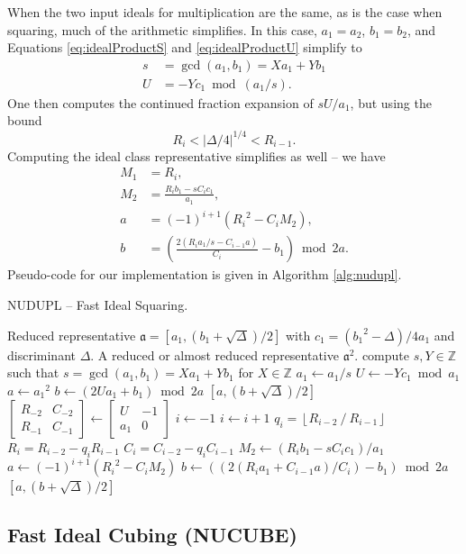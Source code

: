 \documentclass{ucalgthes1}
\theoremstyle{definition}
\newcommand{\ZZ}{\mathbb{Z}}
\newcommand{\matrixtt}[4]{\left[ \begin{array}{rr} #1 & #2 \\ #3 & #4 \end{array} \right]}
\newcommand{\floor}[1]{\left\lfloor #1 \right\rfloor}
\begin{document}
When the two input ideals for multiplication are the same, as is the case when squaring, much of the arithmetic simplifies.  In this case, $a_1 = a_2$, $b_1 = b_2$, and Equations \eqref{eq:idealProductS} and \eqref{eq:idealProductU} simplify to
\begin{align*}
	s &= \gcd(a_1, b_1) = Xa_1 + Yb_1 \\
	U &= -Yc_1 \bmod (a_1/s).
\end{align*}
One then computes the continued fraction expansion of $sU/a_1$, but using the bound
\[
	R_i < |\Delta/4|^{1/4} < R_{i-1}.
\]
Computing the ideal class representative simplifies as well -- we have
\begin{align*}
	M_1 &= R_i, \\
	M_2 &= \frac{R_i b_1 - sC_i c_1}{a_1}, \\
	a &= (-1)^{i+1}({R_i}^2 - C_i M_2), \\
	b &= \left(\frac{2(R_i a_1/s  - C_{i-1} a)}{C_i} - b_1 \right) \bmod{2a}.
\end{align*}
Pseudo-code for our implementation is given in Algorithm \ref{alg:nudupl}.

\begin{algorithm}[htb]
\caption{NUDUPL -- Fast Ideal Squaring.}
\label{alg:nudupl}
\begin{algorithmic}[1]
\Require Reduced representative $\mathfrak a = [a_1, (b_1+\sqrt\Delta)/2]$ with $c_1 = ({b_1}^2-\Delta)/4a_1$ and discriminant $\Delta$.
\Ensure A reduced or almost reduced representative $\mathfrak a^2$.
\State compute $s, Y \in \ZZ$ such that $s = \gcd(a_1, b_1) = Xa_1 + Yb_1$ for $X \in \ZZ$
\State $a_1 \gets a_1/s$
\State $U \gets -Yc_1 \bmod a_1$
	\State $a \gets {a_1}^2$
	\State $b \gets (2Ua_1 + b_1) \bmod 2a$
	\State \Return $[a, (b + \sqrt\Delta)/2]$
\EndIf
\State $\matrixtt{R_{-2}}{C_{-2}}{R_{-1}}{C_{-1}} \gets \matrixtt{U}{-1}{a_1}{0}$
\State $i \gets -1$
	\State $i \gets i + 1$
	\State $q_i = \floor{R_{i-2} ~/~ R_{i-1}}$
	\State $R_i = R_{i-2}-q_i R_{i-1}$
	\State $C_i=C_{i-2}-q_i C_{i-1}$
\EndWhile
\State $M_2 \gets (R_i b_1 -sC_i c_1)/a_1$
\State $a \gets (-1)^{i+1}({R_i}^2 - C_i M_2)$
\State $b \gets ((2(R_i a_1 + C_{i-1} a)/C_i)-b_1) \bmod{2a}$
\State \Return $[a, (b+\sqrt\Delta)/2]$ 
\end{algorithmic}
\end{algorithm}

\subsection{Fast Ideal Cubing (NUCUBE)}
\label{subsec:nucube}
\end{document}
